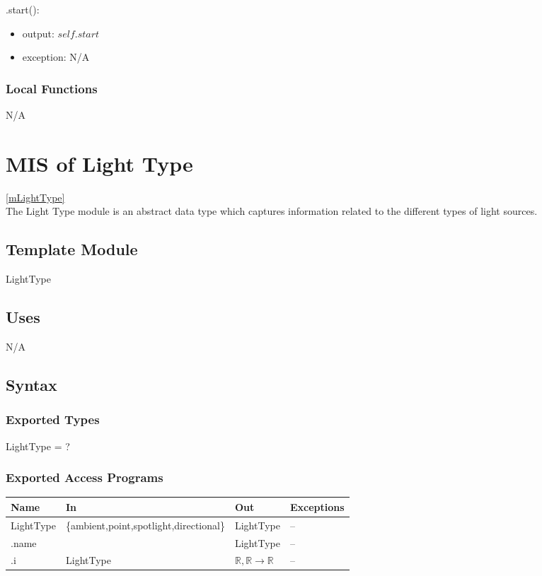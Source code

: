 \documentclass[12pt, titlepage]{article}
\begin{document}
\noindent .start():
\begin{itemize}
	\item output: $self.start$
	\item exception: N/A
\end{itemize}


\subsubsection{Local Functions}
N/A

\newpage

\section{MIS of Light Type} \ref{mLightType} \\
The Light Type module is an abstract data type which captures information 
related to the different types of light sources.

\subsection{Template Module}
LightType

\subsection{Uses}
N/A

\subsection{Syntax}
\subsubsection{Exported Types}
LightType = ?
\subsubsection{Exported Access Programs}
\begin{center}
	\begin{tabular}{p{2cm} p{7cm} p{2cm} p{4cm}}
		\hline
		\textbf{Name} & \textbf{In} & \textbf{Out} & \textbf{Exceptions} \\
		\hline
		LightType & \{ambient,point,spotlight,directional\} & LightType & -- \\
		.name & & LightType & -- \\
		.i & LightType & $\mathbb{R},\mathbb{R} \to 
		\mathbb{R}$ & -- \\
		\hline
	\end{tabular}
\end{center}
\end{document}
